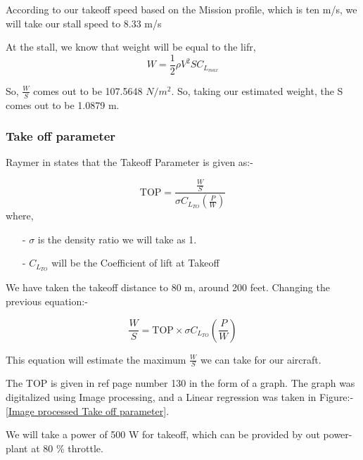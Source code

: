 \documentclass[12 pt]{article}
\begin{document}
According to our takeoff speed based on the Mission profile, which is ten m/s, we will take our stall speed to 8.33 m/s

At the stall, we know that weight will be equal to the lifr,
$$ W = \frac{1}{2} \rho V^2 S C_{L_{max}} $$

So, $\frac{W}{S}$ comes out to be 107.5648 $ N/m^2 $. So, taking our estimated weight, the S comes out to be 1.0879 m.


\subsubsection{{Take off parameter}}

Raymer in \cite{Raymer2006} states that the Takeoff Parameter is given as:- 

$$\text{TOP} = \frac{\frac{W}{S}}{ \sigma C_{L_{TO}} \left( \frac{P}{W} \right) }$$
where,
\begin{itemize}
    \item[-] $\sigma$ is the density ratio we will take as 1.
    \item [-] $C_{L_{TO}}$ will be the Coefficient of lift at Takeoff 
\end{itemize}

We have taken the takeoff distance to 80 m, around 200 feet. Changing the previous equation:-

$$ \frac{W}{S} = \text{TOP} \times \sigma C_{L_{TO}} \left( \frac{P}{W} \right) $$

This equation will estimate the maximum $\frac{W}{S}$ we can take for our aircraft.

The TOP is given in ref \cite{Raymer2006} page number 130 in the form of a graph. The graph was digitalized using Image processing, and a Linear regression was taken in Figure:-\ref{Image processed Take off parameter}. 

We will take a power of 500 W for takeoff, which can be provided by out power-plant at 80 \% throttle. 
\end{document}
